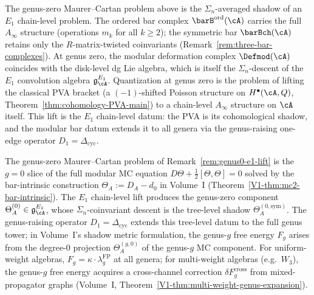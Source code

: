 \begin{remark}
\label{rem:genus0-e1-lift}%
%
%
The genus-zero Maurer--Cartan problem above is the
$\Sigma_n$-averaged shadow of an $E_1$ chain-level problem.
The ordered bar complex $\barB^{\mathrm{ord}}(\cA)$ carries the
full $A_\infty$ structure (operations $m_k$ for all $k \ge 2$);
the symmetric bar $\barBch(\cA)$ retains only the
$R$-matrix-twisted coinvariants
(Remark~\ref{rem:three-bar-complexes}). At genus zero, the
modular deformation complex $\Defmod(\cA)$ coincides with the
disk-level dg Lie algebra, which is itself the $\Sigma_n$-descent
of the $E_1$ convolution algebra
$\mathfrak{g}^{E_1}_\cA$. Quantization at genus zero
is the problem of lifting the classical PVA bracket (a
$(-1)$-shifted Poisson structure on $H^\bullet(\cA, Q)$,
Theorem~\ref{thm:cohomology-PVA-main}) to a chain-level $A_\infty$
structure on $\cA$ itself. This lift is the $E_1$ chain-level
datum: the PVA is its cohomological shadow, and the modular bar
datum extends it to all genera via the genus-raising one-edge
operator $D_1 = \Delta_{\mathrm{cyc}}$.
\end{remark}

\begin{remark}
\label{rem:genus0-quantization-vol1-shadow}%
%
%
The genus-zero Maurer--Cartan problem of
Remark~\ref{rem:genus0-e1-lift} is the $g = 0$ slice of the
full modular MC equation $D\Theta + \tfrac{1}{2}[\Theta,\Theta] = 0$
solved by the bar-intrinsic construction
$\Theta_A := D_A - d_0$ in Volume~I
(Theorem~\ref*{V1-thm:mc2-bar-intrinsic}). The $E_1$
chain-level lift produces the genus-zero component
$\Theta_A^{(0)} \in \mathfrak{g}^{E_1}_\cA$, whose
$\Sigma_n$-coinvariant descent is the tree-level shadow
$\Theta_A^{(0,\mathrm{sym})}$. The genus-raising operator
$D_1 = \Delta_{\mathrm{cyc}}$ extends this tree-level datum
to the full genus tower; in Volume~I's shadow metric
formulation, the genus-$g$ free energy $F_g$ arises from
the degree-$0$ projection $\Theta_A^{(g,0)}$ of the genus-$g$
MC component. For uniform-weight algebras,
$F_g = \kappa \cdot \lambda_g^{\mathrm{FP}}$ at all genera;
for multi-weight algebras (e.g.\ $W_3$), the genus-$g$
free energy acquires a cross-channel correction
$\delta F_g^{\mathrm{cross}}$ from mixed-propagator graphs
(Volume~I, Theorem~\ref*{V1-thm:multi-weight-genus-expansion}).
\end{remark}

